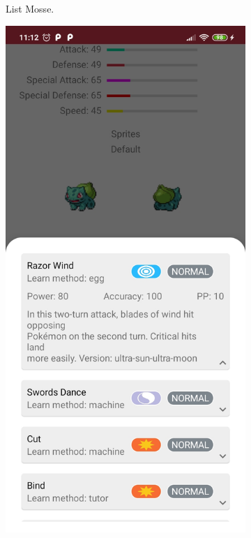 \documentclass[a4paper,11pt]{article}
\begin{document}
\begin{figure}[h!]
{\begin{subfigure}[b]{0.3\linewidth}
    \caption{List Mosse.}
  \end{subfigure}
  \begin{subfigure}[b]{0.3\linewidth}
    \includegraphics[width=\linewidth]{moves_expansion.jpg}

\end{subfigure}}
\end{figure}
\end{document}
